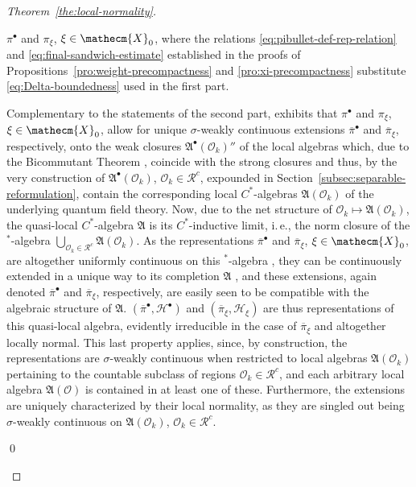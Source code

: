 \documentclass[a4paper,a4paper]{article}
\numberwithin{equation}{section}
\newcommand{\Xecm}{\mathecm{X}}
\newcommand{\Afrak}{\mathfrak{A}}
\newcommand{\Hscr}{\mathscr{H}}
\newcommand{\Oscr}{\mathscr{O}}
\newcommand{\pibar}{\overline{\pi}}
\newcommand{\AO}{\mathfrak{A} ( \mathscr{O} )}
\newcommand{\AOk}{\mathfrak{A} ( \mathscr{O}_k )}
\newcommand{\Rcount}{\mathscr{R}^c}
\newcommand{\Hbullet}{\mathscr{H}^\bullet}
\newcommand{\AbulletOk}{\mathfrak{A}^\bullet ( \mathscr{O}_k )}
\newcounter{proofitem}
\newenvironment{prooflist}{\begin{list}{(\roman{proofitem})}%
  {\usecounter{proofitem} \setlength{\topsep}{0ex}%
   \setlength{\parsep}{0.2ex} \setlength{\itemsep}{0.4ex}%
   \setlength{\leftmargin}{0em} \setlength{\itemindent}{0.5em}%
   \setlength{\listparindent}{1em}}}{\qed \end{list}}
\theoremstyle{definition}
\theoremstyle{plain}
\theoremstyle{remark}
\theoremstyle{assumption}
\begin{document}
\begin{proof}[Theorem~\ref{the:local-normality}]
\begin{prooflist}
      $\pi^\bullet$ and $\pi_\xi$, $\xi \in \Xecm_0$, where the
      relations \eqref{eq:pibullet-def-rep-relation} and
      \eqref{eq:final-sandwich-estimate} established in the proofs of
      Propositions~\ref{pro:weight-precompactness} and
      \ref{pro:xi-precompactness} substitute
      \eqref{eq:Delta-boundedness} used in the first part.
    \item Complementary to the statements of the second part,
      \cite[Lemma~10.1.10]{kadison/ringrose:1986} exhibits that
      $\pi^\bullet$ and $\pi_\xi$, $\xi \in \Xecm_0$, allow for unique
      $\sigma$-weakly continuous extensions $\pibar^\bullet$ and
      $\pibar_\xi$, respectively, onto the weak closures
      $\AbulletOk''$ \cite[Corollary~2.4.15]{bratteli/robinson:1987}
      of the local algebras which, due to the Bicommutant Theorem
      \cite[Theorem~2.4.11]{bratteli/robinson:1987}, coincide with the
      strong closures and thus, by the very construction of
      $\AbulletOk$, $\Oscr_k \in \Rcount$, expounded in
      Section~\ref{subsec:separable-reformulation}, contain the
      corresponding local $C^*$-algebras $\AOk$ of the underlying
      quantum field theory. Now, due to the net structure of $\Oscr_k
      \mapsto \AOk$, the quasi-local $C^*$-algebra $\Afrak$ is its
      $C^*$-inductive limit, i.\,e., the norm closure of the
      $^*$-algebra $\bigcup_{\Oscr_k \in \Rcount} \AOk$. As the
      representations $\pibar^\bullet$ and $\pibar_\xi$, $\xi \in
      \Xecm_0$, are altogether uniformly continuous on this
      $^*$-algebra \cite[Theorem~1.5.7]{pedersen:1979}, they can be
      continuously extended in a unique way to its completion $\Afrak$
      \cite[Chapter One, \S\,5,\,4.(4)]{koethe:1983}, and these
      extensions, again denoted $\pibar^\bullet$ and $\pibar_\xi$,
      respectively, are easily seen to be compatible with the
      algebraic structure of $\Afrak$. $( \pibar^\bullet , \Hbullet )$
      and $( \pibar_\xi , \Hscr_\xi )$ are thus representations of
      this quasi-local algebra, evidently irreducible in the case of
      $\pibar_\xi$ and altogether locally normal. This last property
      applies, since, by construction, the representations are
      $\sigma$-weakly continuous when restricted to local algebras
      $\AOk$ pertaining to the countable subclass of regions $\Oscr_k
      \in \Rcount$, and each arbitrary local algebra $\AO$ is
      contained in at least one of these. Furthermore, the extensions
      are uniquely characterized by their local normality, as they are
      singled out being $\sigma$-weakly continuous on $\AOk$, $\Oscr_k
      \in \Rcount$.
    

\end{prooflist}
\end{proof}
\end{document}
